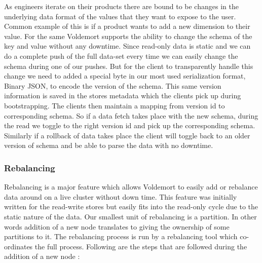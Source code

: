 \documentclass[10pt,twocolumn,preprint,natbib,authoryear]{sigplanconf}
\begin{document}
As engineers iterate on their products there are bound to be changes in the underlying data format of the values that they want to expose to the user. Common example of this is if a product wants to add a new dimension to their value. For the same Voldemort supports the ability to change the schema of the key and value without any downtime. Since read-only data is static and we can do a complete push of the full data-set every time we can easily change the schema during one of our pushes. But for the client to transparently handle this change we need to added a special byte in our most used serialization format, Binary JSON, to encode the version of the schema. This same version information is saved in the stores metadata which the clients pick up during bootstrapping. The clients then maintain a mapping from version id to corresponding schema. So if a data fetch takes place with the new schema, during the read we toggle to the right version id and pick up the corresponding schema. Similarly if a rollback of data takes place the client will toggle back to an older version of schema and be able to parse the data with no downtime. 


\subsubsection{Rebalancing}
\label{sec:read_only:data_cycle:rebalancing}

Rebalancing is a major feature which allows Voldemort to easily add or rebalance data around on a live cluster without down time. This feature was initially written for the read-write stores but easily fits into the read-only cycle due to the static nature of the data. Our smallest unit of rebalancing is a partition. In other words addition of a new node translates to giving the ownership of some partitions to it. The rebalancing process is run by a rebalancing tool which co-ordinates the full process. Following are the steps that are followed during the addition of a new node :
\end{document}
